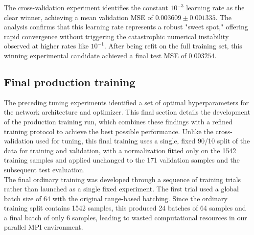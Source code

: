 The cross-validation experiment identifies the constant $10^{-3}$ learning rate as the clear winner, achieving a mean validation MSE of $0.003609\pm0.001335$. The analysis confirms that this learning rate represents a robust "sweet spot," offering rapid convergence without triggering the catastrophic numerical instability observed at higher rates like $10^{-1}$. After being refit on the full training set, this winning experimental candidate achieved a final test MSE of $0.003254$.\\

\subsection{Final production training}
\label{sec:04_final_training}

The preceding tuning experiments identified a set of optimal hyperparameters for the network architecture and optimizer. This final section details the development of the production training run, which combines these findings with a refined training protocol to achieve the best possible performance. Unlike the cross-validation used for tuning, this final training uses a single, fixed 90/10 split of the data for training and validation, with a normalization fitted only on the 1542 training samples and applied unchanged to the 171 validation samples and the subsequent test evaluation.\\

The final ordinary training was developed through a sequence of training trials rather than launched as a single fixed experiment. The first trial used a global batch size of 64 with the original range-based batching. Since the ordinary training split contains 1542 samples, this produced 24 batches of 64 samples and a final batch of only 6 samples, leading to wasted computational resources in our parallel MPI environment.\\


